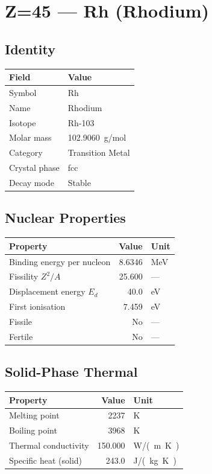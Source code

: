 \documentclass[11pt,a4paper]{article}
\begin{document}
\newpage

\section{Z=45 --- Rh (Rhodium)}
\label{sec:Z45}

\subsection{Identity}
\begin{tabular}{ll}
  \toprule
  Field & Value \\
  \midrule
  Symbol & Rh \\
  Name & Rhodium \\
  Isotope & Rh-103 \\
  Molar mass & \SI{102.9060}{g/mol} \\
  Category & Transition Metal \\
  Crystal phase & fcc \\
  Decay mode & Stable \\
  \bottomrule
\end{tabular}

\subsection{Nuclear Properties}
\begin{tabular}{lrl}
  \toprule
  Property & Value & Unit \\
  \midrule
  Binding energy per nucleon & 8.6346 & \si{MeV} \\
  Fissility $Z^2/A$ & 25.600 & --- \\
  Displacement energy $E_d$ & 40.0 & \si{eV} \\
  First ionisation & 7.459 & \si{eV} \\
  Fissile & No & --- \\
  Fertile & No & --- \\
  \bottomrule
\end{tabular}

\subsection{Solid-Phase Thermal}
\begin{tabular}{lrl}
  \toprule
  Property & Value & Unit \\
  \midrule
  Melting point & 2237 & \si{K} \\
  Boiling point & 3968 & \si{K} \\
  Thermal conductivity & 150.000 & \si{W/(m.K)} \\
  Specific heat (solid) & 243.0 & \si{J/(kg.K)} \\
  \bottomrule
\end{tabular}
\end{document}
